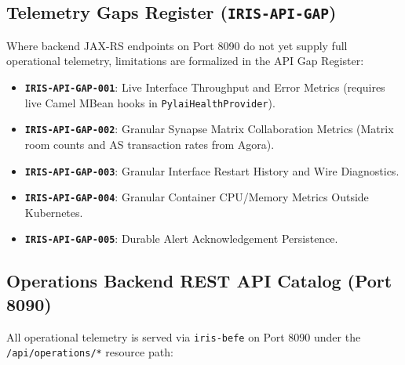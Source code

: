 \subsection{Telemetry Gaps Register (\texttt{IRIS-API-GAP})}
Where backend JAX-RS endpoints on Port 8090 do not yet supply full operational telemetry, limitations are formalized in the API Gap Register:
\begin{itemize}
    \item \textbf{\texttt{IRIS-API-GAP-001}}: Live Interface Throughput and Error Metrics (requires live Camel MBean hooks in \texttt{PylaiHealthProvider}).
    \item \textbf{\texttt{IRIS-API-GAP-002}}: Granular Synapse Matrix Collaboration Metrics (Matrix room counts and AS transaction rates from Agora).
    \item \textbf{\texttt{IRIS-API-GAP-003}}: Granular Interface Restart History and Wire Diagnostics.
    \item \textbf{\texttt{IRIS-API-GAP-004}}: Granular Container CPU/Memory Metrics Outside Kubernetes.
    \item \textbf{\texttt{IRIS-API-GAP-005}}: Durable Alert Acknowledgement Persistence.
\end{itemize}

\subsection{Operations Backend REST API Catalog (Port 8090)}

All operational telemetry is served via \texttt{iris-befe} on Port 8090 under the \texttt{/api/operations/*} resource path:

